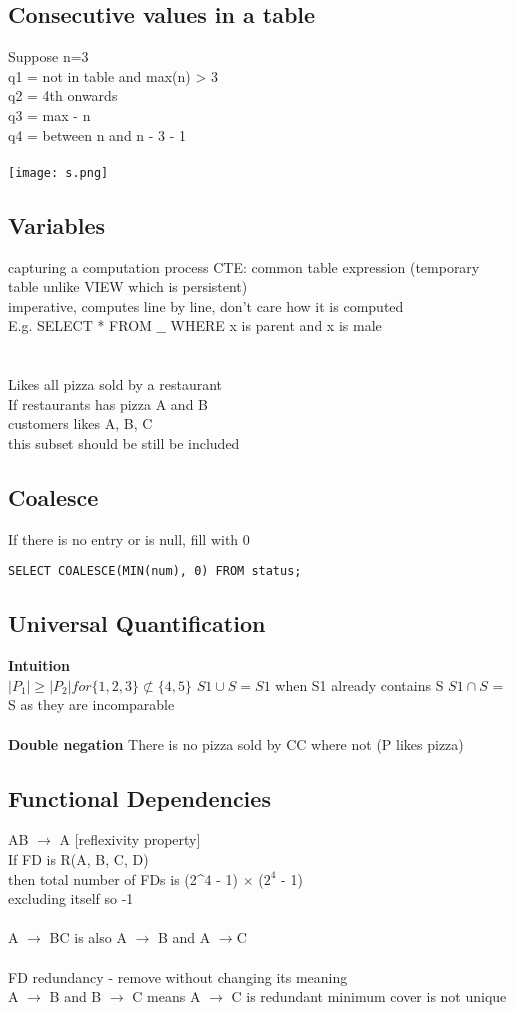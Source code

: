 \documentclass[11pt]{article}
\begin{document}
\subsection*{Consecutive values in a table}
Suppose n=3\\
q1 = not in table and max(n) > 3 \\
q2 = 4th onwards \\
q3 = max - n\\
q4 = between n and n - 3 - 1 \\
\\
\texttt{[image: s.png]}
\subsection*{Variables}
capturing a computation process
CTE: common table expression (temporary table unlike VIEW which is persistent)
\\
imperative, computes line by line, don't care how it is computed\\
E.g. SELECT * FROM $\_\_$ WHERE x is parent and x is male \\
\\
\\
Likes all pizza sold by a restaurant\\
If restaurants has pizza A and B\\
customers likes A, B, C\\
this subset should be still be included
\subsection*{Coalesce}
If there is no entry or is null, fill with 0\\
\begin{verbatim}
SELECT COALESCE(MIN(num), 0) FROM status;	
\end{verbatim}
\subsection*{Universal Quantification}
\textbf{Intuition}
\\
$|P_{1}| \geq |P_{2}| for \{1, 2, 3\} \not\subset \{4, 5\}$
$S1 \cup S = S1$ when S1 already contains S
$S1 \cap S$ = S
as they are incomparable
\\\\
\textbf{Double negation}
There is no pizza sold by CC where not (P likes pizza) 
\subsection*{Functional Dependencies}
AB $\rightarrow$ A [reflexivity property]\\
If FD is R(A, B, C, D)\\
then total number of FDs is (2^4 - 1) $\times$  ($2^4$ - 1)\\
excluding itself so -1\\
\\
A $\rightarrow$ BC is also A $\rightarrow$ B and A $\rightarrow $C
\\\\
FD redundancy - remove without changing its meaning\\
A $\rightarrow$ B and B $\rightarrow$ C means A $\rightarrow$ C is redundant
minimum cover is not unique
\end{document}
